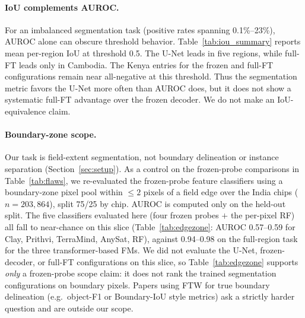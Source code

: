 \documentclass{article}
\begin{document}
\paragraph{IoU complements AUROC.} For an imbalanced segmentation task (positive
rates spanning 0.1\%--23\%), AUROC alone can obscure threshold behavior.
Table~\ref{tab:iou_summary} reports mean per-region IoU at threshold 0.5. The U-Net
leads in five regions, while full-FT leads only in Cambodia. The Kenya entries for the
frozen and full-FT configurations remain near all-negative at this threshold. Thus the
segmentation metric favors the U-Net more often than AUROC does, but it does not show a
systematic full-FT advantage over the frozen decoder. We do not make an IoU-equivalence
claim.

\paragraph{Boundary-zone scope.} Our task is field-extent
segmentation, not boundary delineation or instance separation
(Section~\ref{sec:setup}). As a control on the frozen-probe comparisons in
Table~\ref{tab:flaws}, we re-evaluated the frozen-probe feature classifiers using a
boundary-zone pixel pool within $\le 2$ pixels of a field edge over the India chips
($n{=}203{,}864$), split 75/25 by chip. AUROC is computed only on the held-out split. The five classifiers evaluated here (four frozen probes $+$ the per-pixel
RF) all fall to near-chance on this slice (Table~\ref{tab:edgezone}: AUROC
0.57--0.59 for Clay, Prithvi, TerraMind, AnySat, RF), against 0.94--0.98 on the
full-region task for the three transformer-based FMs. We did not evaluate the U-Net, frozen-decoder, or full-FT
configurations on this slice, so Table~\ref{tab:edgezone} supports \emph{only} a
frozen-probe scope claim: it does not rank the trained segmentation configurations
on boundary pixels. Papers using FTW for true boundary delineation (e.g.\ object-F1
or Boundary-IoU style metrics) ask a strictly harder question and are outside our
scope.
\end{document}
